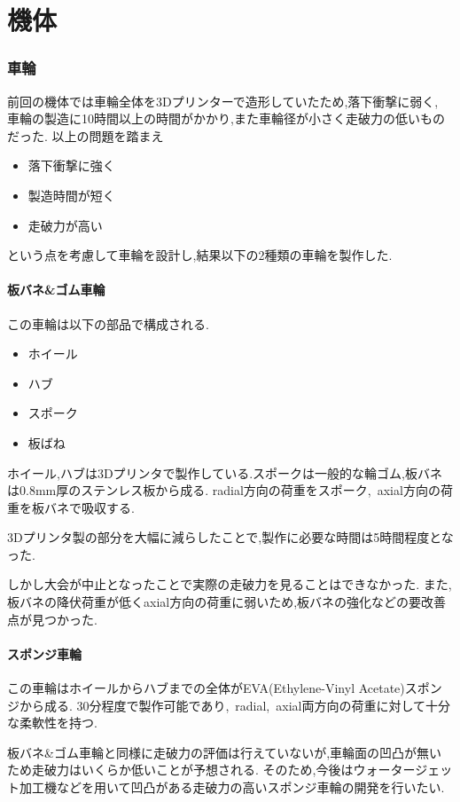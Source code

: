 \part*{機体}
\section{車輪}
前回の機体では車輪全体を3Dプリンターで造形していたため,落下衝撃に弱く,
車輪の製造に10時間以上の時間がかかり,また車輪径が小さく走破力の低いものだった.
以上の問題を踏まえ
\begin{itemize}
  \item 落下衝撃に強く
  \item 製造時間が短く
  \item 走破力が高い
\end{itemize}
という点を考慮して車輪を設計し,結果以下の2種類の車輪を製作した.
\subsection{板バネ\&ゴム車輪}
この車輪は以下の部品で構成される.
\begin{itemize}
  \item ホイール
  \item ハブ
  \item スポーク
  \item 板ばね
\end{itemize}
ホイール,ハブは3Dプリンタで製作している.スポークは一般的な輪ゴム,板バネは0.8mm厚のステンレス板から成る.
radial方向の荷重をスポーク,\ axial方向の荷重を板バネで吸収する.

3Dプリンタ製の部分を大幅に減らしたことで,製作に必要な時間は5時間程度となった.

しかし大会が中止となったことで実際の走破力を見ることはできなかった.
また,板バネの降伏荷重が低くaxial方向の荷重に弱いため,板バネの強化などの要改善点が見つかった.
\vfill\null
\columnbreak
{}
\subsection{スポンジ車輪}
この車輪はホイールからハブまでの全体がEVA(Ethylene-Vinyl Acetate)スポンジから成る.
30分程度で製作可能であり,\ radial,\ axial両方向の荷重に対して十分な柔軟性を持つ.

板バネ\&ゴム車輪と同様に走破力の評価は行えていないが,車輪面の凹凸が無いため走破力はいくらか低いことが予想される.
そのため,今後はウォータージェット加工機などを用いて凹凸がある走破力の高いスポンジ車輪の開発を行いたい.
\vfill\null
\columnbreak
